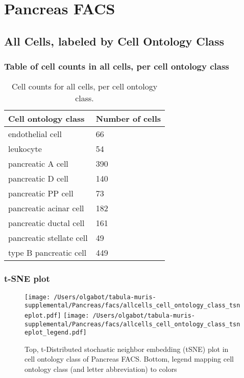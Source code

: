 \clearpage
\section{Pancreas FACS}

\subsection{All Cells, labeled by Cell Ontology Class}
\subsubsection{Table of cell counts in all cells, per cell ontology class}\begin{table}[h]
\centering
\label{my-label}
\begin{tabular}{@{}ll@{}}
\toprule

Cell ontology class& Number of cells \\ \midrule
endothelial cell & 66 \\

leukocyte & 54 \\

pancreatic A cell & 390 \\

pancreatic D cell & 140 \\

pancreatic PP cell & 73 \\

pancreatic acinar cell & 182 \\

pancreatic ductal cell & 161 \\

pancreatic stellate cell & 49 \\

type B pancreatic cell & 449 \\
\bottomrule
\end{tabular}
\caption{Cell counts for all cells, per cell ontology class.}
\end{table}

\clearpage
\subsubsection{t-SNE plot}
\begin{figure}[h]
\centering
\texttt{[image: /Users/olgabot/tabula-muris-supplemental/Pancreas/facs/allcells\_cell\_ontology\_class\_tsneplot.pdf]}
\texttt{[image: /Users/olgabot/tabula-muris-supplemental/Pancreas/facs/allcells\_cell\_ontology\_class\_tsneplot\_legend.pdf]}
\caption{Top, t-Distributed stochastic neighbor embedding (tSNE) plot  in cell ontology class of Pancreas FACS. Bottom, legend mapping cell ontology class (and letter abbreviation) to colors}
\end{figure}


